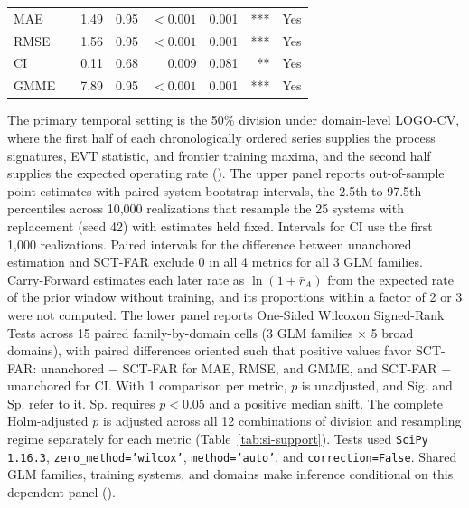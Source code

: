 \documentclass{article}
\begin{document}
\begin{table}[H]
\begin{tabularx}{\linewidth}{@{}>{\raggedright\arraybackslash}Xlrrrrrr@{}}
\midrule
MAE & & 1.49 & 0.95 & $<0.001$ & 0.001 & *** & Yes \\
RMSE & & 1.56 & 0.95 & $<0.001$ & 0.001 & *** & Yes \\
CI & & 0.11 & 0.68 & 0.009 & 0.081 & ** & Yes \\
GMME & & 7.89 & 0.95 & $<0.001$ & 0.001 & *** & Yes \\
\bottomrule
\end{tabularx}
\par\vspace{12pt}
\begin{minipage}{\linewidth}
\footnotesize
The primary temporal setting is the 50\% division under domain-level LOGO-CV, where the first half of each chronologically ordered series supplies the process signatures, EVT statistic, and frontier training maxima, and the second half supplies the expected operating rate (). The upper panel reports out-of-sample point estimates with paired system-bootstrap intervals, the 2.5th to 97.5th percentiles across 10,000 realizations that resample the 25 systems with replacement (seed 42) with estimates held fixed. Intervals for CI use the first 1,000 realizations. Paired intervals for the difference between unanchored estimation and SCT-FAR exclude 0 in all 4 metrics for all 3 GLM families. Carry-Forward estimates each later rate as $\ln(1 + \bar{r}_A)$ from the expected rate of the prior window without training, and its proportions within a factor of 2 or 3 were not computed. The lower panel reports One-Sided Wilcoxon Signed-Rank Tests across 15 paired family-by-domain cells (3 GLM families $\times$ 5 broad domains), with paired differences oriented such that positive values favor SCT-FAR: unanchored $-$ SCT-FAR for MAE, RMSE, and GMME, and SCT-FAR $-$ unanchored for CI. With 1 comparison per metric, $p$ is unadjusted, and Sig. and Sp. refer to it. Sp. requires $p<0.05$ and a positive median shift. The complete Holm-adjusted $p$ is adjusted across all 12 combinations of division and resampling regime separately for each metric (Table~\ref{tab:si-support}). Tests used \texttt{SciPy 1.16.3}, \texttt{zero\_method='wilcox'}, \texttt{method='auto'}, and \texttt{correction=False}. Shared GLM families, training systems, and domains make inference conditional on this dependent panel ().
\end{minipage}
\end{table}
\end{document}
